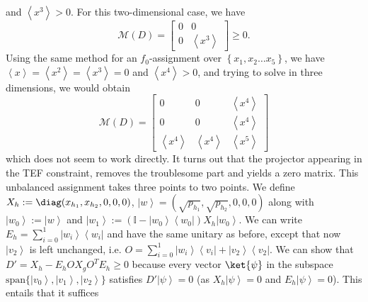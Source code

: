 \documentclass{article}
\begin{document}
and $\left\langle x^{3}\right\rangle >0$. For this two-dimensional case, we have
\begin{displaymath}
  \mathcal{M}(D)=\left[\begin{array}{cc}
      0 & 0                               \\
      0 & \left\langle x^{3}\right\rangle
    \end{array}\right]\ge0.
\end{displaymath}
Using the same method for an $f_{0}$-assignment
over $\left\{ x_{1},x_{2}\dots x_{5}\right\} $, we have $\left\langle x\right\rangle =\left\langle x^{2}\right\rangle =\left\langle x^{3}\right\rangle =0$
and $\left\langle x^{4}\right\rangle >0$, and trying to solve in three
dimensions, we would obtain
\begin{equation}
  \mathcal{M}(D)=\left[\begin{array}{ccc}
      0                               & 0                               & \left\langle x^{4}\right\rangle \\
      0                               & 0                               & \left\langle x^{4}\right\rangle \\
      \left\langle x^{4}\right\rangle & \left\langle x^{4}\right\rangle & \left\langle x^{5}\right\rangle
    \end{array}\right]\label{eq:exampleSubMatrix}
\end{equation}
which does not seem to work directly. It turns out that the projector
appearing in the TEF constraint, removes the troublesome
part and yields a zero matrix. This unbalanced assignment takes three points to
two points. We define $X_{h}:=\diag(x_{h_{1}},x_{h_{2}},0,0,0)$,
$\left|w\right\rangle =(\sqrt{p_{h_{1}}},\sqrt{p_{h_{2}}},0,0,0)$ along with $\left|w_{0}\right\rangle   :=\left|w\right\rangle$  and
$\left|w_{1}\right\rangle   :=\left(\mathbb{I}-\left|w_{0}\right\rangle \left\langle w_{0}\right|\right)X_{h}\left|w_{0}\right\rangle$. We can write $E_{h}=\sum_{i=0}^{1}\left|w_{i}\right\rangle \left\langle w_{i}\right|$
and have the same unitary as before, except that now $\left|v_{2}\right\rangle $ is left
unchanged, i.e. $O=\sum_{i=0}^{1}\left|w_{i}\right\rangle \left\langle v_{i}\right|+\left|v_{2}\right\rangle \left\langle v_{2}\right|$.
We can show that $D'=X_{h}-E_{h}OX_{g}O^{T}E_{h}\ge0$ because
every vector $\ket{\psi}$ in the subspace $\text{span}\{\left|v_{0}\right\rangle ,\left|v_{1}\right\rangle ,\left|v_{2}\right\rangle \}$
satisfies $D'\left|\psi\right\rangle =0$ (as $X_{h}\left|\psi\right\rangle =0$
and $E_{h}\left|\psi\right\rangle =0$). This entails that it suffices
\end{document}

